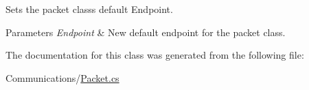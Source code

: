 Sets the packet class\textquotesingle{}s default Endpoint. 


\begin{DoxyParams}{Parameters}
{\em Endpoint} & New default endpoint for the packet class. \\
\hline
\end{DoxyParams}


The documentation for this class was generated from the following file\+:\begin{DoxyCompactItemize}
\item 
Communications/\hyperlink{_packet_8cs}{Packet.\+cs}\end{DoxyCompactItemize}
